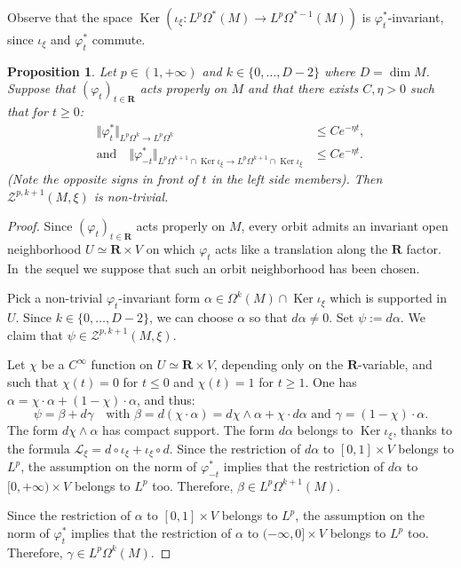 \documentclass[JEP,XML,SOM,Unicode,published]{cedram}
\newcommand{\RR}{\mathbf{R}}
\theoremstyle{plain}
\newtheorem{proposition}[equation]{Proposition}
\theoremstyle{remark}
\theoremstyle{definition}
\DeclareMathOperator{\Ker}{Ker}
\begin{document}
Observe that the space $\Ker (\iota_\xi: L^p \Omega^* (M) \to L^p \Omega^{* -1}(M))$ is $\varphi_t^*$-invariant, since $\iota_\xi$ and $\varphi_t^*$ commute.
\begin{proposition}\label{current-proposition2}
Let $p \in (1, +\infty)$ and $k \in \{0, \dots, D-2\}$ where $D = \dim M$.
Suppose that $(\varphi_t)_{t \in\RR}$ acts properly on $M$ and
that there exists
$C, \eta > 0$ such that for $t \geqslant 0$:
\begin{align*}
\Vert \varphi^*_t \Vert_{L^p \Omega^k \to L^p \Omega^k} &\leqslant C e^{-\eta t},\\
\text{and}\quad \Vert \varphi^*_{-t} \Vert_{L^p \Omega^{k +1} \cap \Ker \iota_\xi \to L^p \Omega^{k+1} \cap \Ker \iota_\xi} &\leqslant C e^{-\eta t}.
\end{align*}
(Note the opposite signs in front of $t$ in the left side members).
Then $\mathcal Z^{p,k+1} (M, \xi)$ is non-trivial.
\end{proposition}

\begin{proof} Since $(\varphi_t)_{t \in\RR}$ acts properly on $M$, every orbit admits an invariant open neighborhood
$U \simeq \RR \times V$ on which $\varphi_t$ acts like a translation along the $\RR$ factor.
In~the sequel we suppose that such an orbit neighborhood has been chosen.

Pick a non-trivial $\varphi_t$-invariant form $\alpha \in \Omega^k (M) \cap \Ker \iota_\xi$ which is supported in $U$. Since $k \in \{0, \dots, D-2\}$, we can choose $\alpha$ so that $d \alpha \neq 0$. Set $\psi:= d\alpha$.
We claim that $\psi \in \mathcal Z^{p,k+1} (M, \xi)$.

Let $\chi$ be a $C^\infty$ function on $U \simeq \RR \times V$,
depending only on the $\RR$-variable, and such that $\chi (t) = 0$ for $t \leqslant 0$ and $\chi (t) =1$ for $t \geqslant 1$.
One has $\alpha = \chi \cdot \alpha + (1 - \chi)\cdot \alpha$, and thus:
\[\psi = \beta + d\gamma \quad\text{with } \beta = d(\chi \cdot \alpha) = d\chi \wedge \alpha + \chi \cdot d\alpha
\text{ and } \gamma = (1 - \chi)\cdot \alpha.\]
The form $d\chi \wedge \alpha$ has compact support. The form $d \alpha$ belongs to $\Ker \iota_\xi$, thanks to the formula
$\mathcal L_\xi = d \circ \iota_\xi + \iota_\xi \circ d$. Since the restriction of
$d\alpha$ to $[0,1] \times V$ belongs to $L^p$, the assumption on the norm of $\varphi_{-t}^*$ implies that the restriction of $d\alpha$ to $[0, +\infty) \times V$ belongs to $L^p$ too.
Therefore, $\beta \in L^p \Omega^{k+1} (M)$.

Since the restriction of $\alpha$ to $[0,1] \times V$ belongs to $L^p$, the assumption on the norm of $\varphi_t^*$ implies that the restriction
of $\alpha$ to $(-\infty, 0]\times V$
belongs to $L^p$ too. Therefore, $\gamma \in L^p \Omega^k(M)$.
\end{proof}
\end{document}
